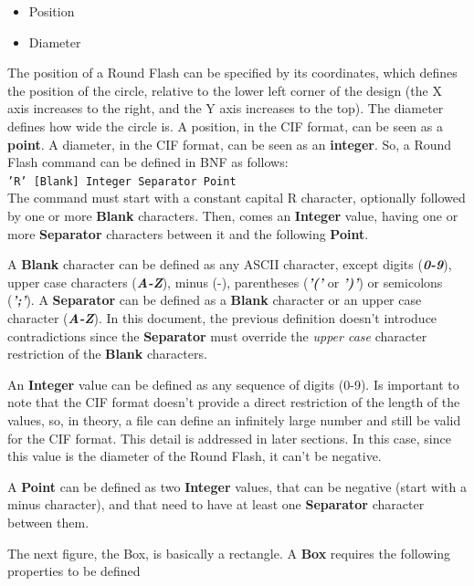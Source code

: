 \documentclass[11pt,twoside,openany,x11names,svgnames]{memoir}
\begin{document}
\begin{itemize}
\item Position
\item Diameter
\end{itemize}

The position of a Round Flash can be specified by its coordinates, which defines the position of the circle, relative to the lower left corner of the design (the X axis increases to the right, and the Y axis increases to the top). The diameter defines how wide the circle is. A position, in the CIF format, can be seen as a \textbf{point}. A diameter, in the CIF format, can be seen as an \textbf{integer}. So, a Round Flash command can be defined in BNF as follows:\\

\texttt{'R' [Blank] Integer Separator Point}\\

The command must start with a constant capital R character, optionally followed by one or more \textbf{Blank} characters. Then, comes an \textbf{Integer} value, having one or more \textbf{Separator} characters between it and the following \textbf{Point}.

A \textbf{Blank} character can be defined as any ASCII character, except digits (\textbf{\textit{0-9}}), upper case characters (\textbf{\textit{A-Z}}), minus (-), parentheses (\textbf{\textit{'('}} or \textbf{\textit{')'}}) or semicolons (\textbf{\textit{';'}}). A \textbf{Separator} can be defined as a \textbf{Blank} character or an upper case character (\textbf{\textit{A-Z}}). In this document, the previous definition doesn't introduce contradictions since the \textbf{Separator} must override the \textit{upper case} character restriction of the \textbf{Blank} characters.

An \textbf{Integer} value can be defined as any sequence of digits (0-9). Is important to note that the CIF format doesn't provide a direct restriction of the length of the values, so, in theory, a file can define an infinitely large number and still be valid for the CIF format. This detail is addressed in later sections. In this case, since this value is the diameter of the Round Flash, it can't be negative.

A \textbf{Point} can be defined as two \textbf{Integer} values, that can be negative (start with a minus character), and that need to have at least one \textbf{Separator} character between them.

The next figure, the Box, is basically a rectangle. A \textbf{Box} requires the following properties to be defined  
 
\end{document}
